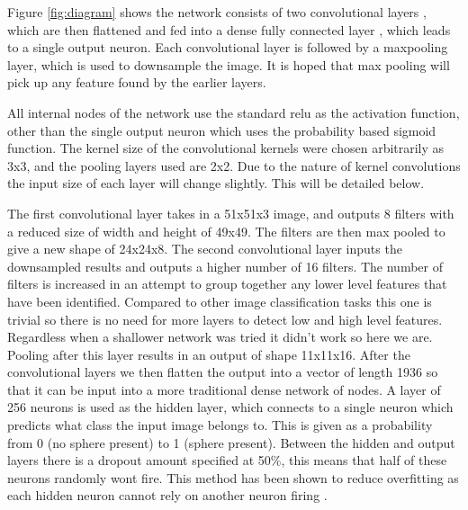 \documentclass{article}
\begin{document}
Figure \ref{fig:diagram} shows the network consists of two convolutional layers
, which are then flattened and fed into  a dense fully connected layer
, which leads to a single output neuron.
Each convolutional layer is followed by a maxpooling layer, which is used to downsample the image.
It is hoped that max pooling will pick up any feature found by the earlier layers.

All internal nodes of the network use the standard relu as the activation function, other than the single output neuron which uses the probability based sigmoid function.
The kernel size of the convolutional kernels were chosen arbitrarily as 3x3, and the pooling layers used are 2x2.
Due to the nature of kernel convolutions the input size of each layer will change slightly.
This will be detailed below.

The first convolutional layer takes in a 51x51x3 image, and outputs 8 filters with a reduced size of width and height of 49x49.
The filters are then max pooled to give a new shape of 24x24x8.
The second convolutional layer inputs the downsampled results and outputs a higher number of 16 filters.
The number of filters is increased in an attempt to group together any lower level features that have been identified.
Compared to other image classification tasks this one is trivial so there is no need for more layers to detect low and high level features.
Regardless when a shallower network was tried it didn't work so here we are.  
Pooling after this layer results in an output of shape 11x11x16.
After the convolutional layers we then flatten the output into a vector of length 1936 so that it can be input into a more traditional dense network of nodes.
A layer of 256 neurons is used as the hidden layer, which connects to a single neuron which predicts what class the input image belongs to.
This is given as a probability from 0 (no sphere present) to 1 (sphere present).
Between the hidden and output layers there is a dropout amount specified at 50\%, this means that half of these neurons randomly wont fire.
This method has been shown to reduce overfitting as each hidden neuron cannot rely on another neuron firing \cite{hinton2012improving}. %
\end{document}
